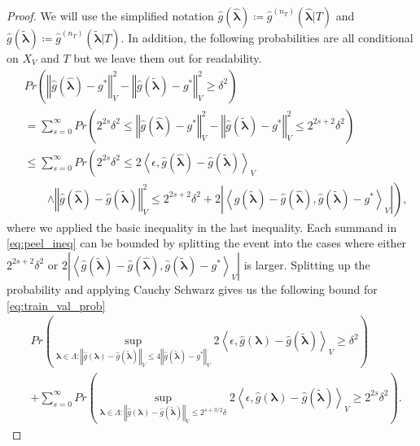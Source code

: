 \documentclass[10pt]{book}
\theoremstyle{definition}
\begin{document}
\begin{proof}
	We will use the simplified notation $\hat{g}(\hat{\boldsymbol{\lambda}}) \coloneqq \hat{g}^{(n_T)}(\hat{\boldsymbol{\lambda}} | T)$ and $\hat{g}(\tilde{\boldsymbol{\lambda}}) \coloneqq \hat{g}^{(n_T)}(\tilde{\boldsymbol{\lambda}} | T)$. In addition, the following probabilities are all conditional on $X_V$ and $T$ but we leave them out for readability.
	\begin{align}
	&  Pr\left(\left\Vert \hat{g}(\hat{\boldsymbol{\lambda}})-g^{*}\right\Vert _{V}^{2}-\left\Vert \hat{g}(\tilde{\boldsymbol{\lambda}})-g^{*}\right\Vert _{V}^{2}\ge\delta^{2}\right) \label{eq:train_val_prob}\\
	& = \sum_{s=0}^{\infty}Pr\left(2^{2s}\delta^{2}\le\left\Vert \hat{g}(\hat{\boldsymbol{\lambda}})-g^{*}\right\Vert _{V}^{2}-\left\Vert \hat{g}(\tilde{\boldsymbol{\lambda}})-g^{*}\right\Vert _{V}^{2}\le2^{2s+2}\delta^{2}\right) 
	\label{eq:peeled} \\
	&\le \sum_{s=0}^{\infty} Pr\left(2^{2s}\delta^{2}\le2\left\langle \epsilon,\hat{g}(\hat{\boldsymbol{\lambda}})-\hat{g}(\tilde{\boldsymbol{\lambda}})\right\rangle _{V}\right. \label{eq:peel_ineq}\\
	& \qquad  \left.\wedge \left\Vert \hat{g}(\hat{\boldsymbol{\lambda}})-\hat{g}(\tilde{\boldsymbol{\lambda}})\right\Vert_{V}^{2}\le2^{2s+2}\delta^{2}+ 2\left|\left\langle \hat{g}(\tilde{\boldsymbol{\lambda}})-\hat{g}(\hat{\boldsymbol{\lambda}}),\hat{g}(\tilde{\boldsymbol{\lambda}})-g^{*}\right\rangle _{V}\right| \right ),
	\end{align}
	where we applied the basic inequality in the last inequality.
	Each summand in \eqref{eq:peel_ineq} can be bounded by splitting the event into the cases where either $2^{2s+2} \delta^2$ or $2\left|\left\langle \hat{g}(\tilde{\boldsymbol{\lambda}})-\hat{g}(\hat{\boldsymbol{\lambda}}),\hat{g}(\tilde{\boldsymbol{\lambda}})-g^{*}\right\rangle _{V}\right|$ is larger. Splitting up the probability and applying Cauchy Schwarz gives us the following bound for \eqref{eq:train_val_prob}
	\begin{align}
	& Pr\left(
	\sup_{\boldsymbol{\lambda} \in \Lambda: \left\Vert \hat{g}({\boldsymbol{\lambda}})-\hat{g}(\tilde{\boldsymbol{\lambda}})\right\Vert _{V}
		\le
		4\left\Vert \hat{g}(\tilde{\boldsymbol{\lambda}})-g^{*}\right\Vert _{V}}
	2\left\langle \epsilon,\hat{g}({\boldsymbol{\lambda}})-\hat{g}(\tilde{\boldsymbol{\lambda}})\right\rangle _{V}
	\ge 
	\delta^{2}
	\right)
	\label{eq:train_val_1}
	\\
	& + \sum_{s=0}^{\infty} Pr\left(
	\sup_{\boldsymbol{\lambda} \in \Lambda: \left\Vert \hat{g}({\boldsymbol{\lambda}})-\hat{g}(\tilde{\boldsymbol{\lambda}})\right\Vert _{V}
		\le
		2^{s+3/2}\delta}
	2\left\langle \epsilon,\hat{g}({\boldsymbol{\lambda}})-\hat{g}(\tilde{\boldsymbol{\lambda}})\right\rangle _{V}
	\ge
	2^{2s} \delta^{2}
	\right)
	\label{eq:train_val_2}.
	\end{align}
	

\end{proof}
\end{document}
